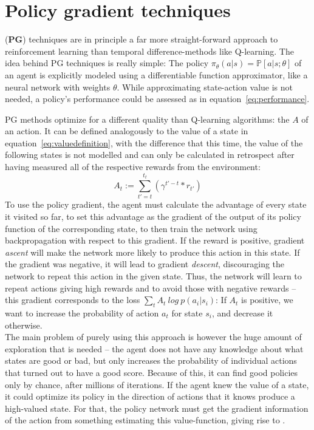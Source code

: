 
\section{Policy gradient techniques}

 (\textbf{PG}) techniques \cite{sutton_policy_2000} are in principle a far more straight-forward approach to reinforcement learning than temporal difference-methods like Q-learning. The idea behind PG techniques is really simple: The policy $\pi_\theta(a|s) = \mathds{P}[a|s;\theta]$ of an agent is explicitly modeled using a differentiable function approximator, like a neural network with weights $\theta$. While approximating state-action value is not needed, a policy's performance could be assessed as in equation~\ref{eq:performance}. 

PG methods optimize for a different quality than Q-learning algorithms: the  $A$ of an action. It can be defined analogously to the value of a state in equation~\ref{eq:valuedefinition}, with the difference that this time, the value of the following states is not modelled and can only be calculated in retrospect after having measured all of the respective rewards from the environment:
\begin{equation}
	 A_t := \sum_{t'=t}^{t_t} ( \gamma^{t'-t} * r_{t'} ) 
\end{equation}
To use the policy gradient, the agent must calculate the advantage of every state it visited so far, to set this advantage as the gradient of the output of its policy function of the corresponding state, to then train the network using backpropagation with respect to this gradient. If the reward is positive, gradient \textit{ascent} will make the network more likely to produce this action in this state. If the gradient was negative, it will lead to gradient \textit{descent}, discouraging the network to repeat this action in the given state. Thus, the network will learn to repeat actions giving high rewards and to avoid those with negative rewards -- this gradient corresponds to the loss $\sum_t A_t~log~p(a_i|s_i)$: If $A_t$ is positive, we want to increase the probability of action $a_t$ for state $s_i$, and decrease it otherwise.\\

\noindent The main problem of purely using this approach is however the huge amount of exploration that is needed -- the agent does not have any knowledge about what states are good or bad, but only increases the probability of individual actions that turned out to have a good score. Because of this, it can find good policies only by chance, after millions of iterations. If the agent knew the value of a state, it could optimize its policy in the direction of actions that it knows produce a high-valued state. For that, the policy network must get the gradient information of the action from something estimating this value-function, giving rise to .

